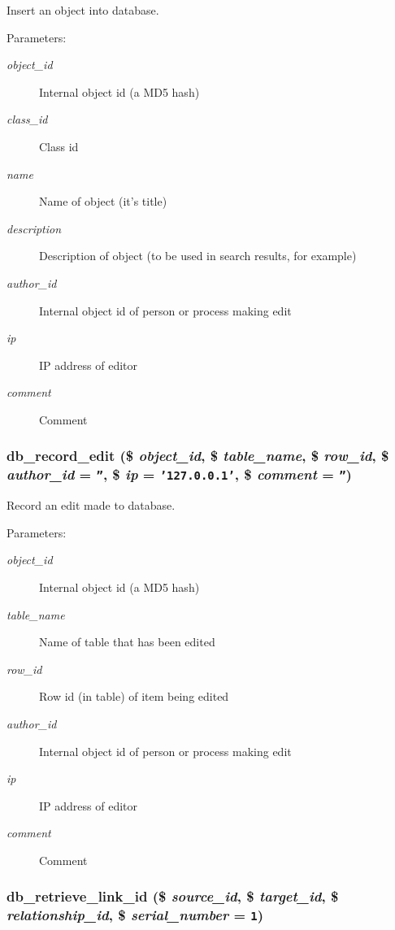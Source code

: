Insert an object into database. 

\begin{Desc}
\item[Parameters:]
\begin{description}
\item[{\em object\_\-id}]Internal object id (a MD5 hash) \item[{\em class\_\-id}]Class id \item[{\em name}]Name of object (it's title) \item[{\em description}]Description of object (to be used in search results, for example) \item[{\em author\_\-id}]Internal object id of person or process making edit \item[{\em ip}]IP address of editor \item[{\em comment}]Comment \end{description}
\end{Desc}
\hypertarget{eav_8php_1749f5ed26505143b2f675c5f907c4e7}{
\subsubsection{\setlength{\rightskip}{0pt plus 5cm}db\_\-record\_\-edit (\$ {\em object\_\-id}, \/  \$ {\em table\_\-name}, \/  \$ {\em row\_\-id}, \/  \$ {\em author\_\-id} = {\tt ''}, \/  \$ {\em ip} = {\tt '127.0.0.1'}, \/  \$ {\em comment} = {\tt ''})}}
\label{eav_8php_1749f5ed26505143b2f675c5f907c4e7}


Record an edit made to database. 

\begin{Desc}
\item[Parameters:]
\begin{description}
\item[{\em object\_\-id}]Internal object id (a MD5 hash) \item[{\em table\_\-name}]Name of table that has been edited \item[{\em row\_\-id}]Row id (in table) of item being edited \item[{\em author\_\-id}]Internal object id of person or process making edit \item[{\em ip}]IP address of editor \item[{\em comment}]Comment \end{description}
\end{Desc}
\hypertarget{eav_8php_af41b9a208dee0874f2fb40ae2678586}{
\subsubsection{\setlength{\rightskip}{0pt plus 5cm}db\_\-retrieve\_\-link\_\-id (\$ {\em source\_\-id}, \/  \$ {\em target\_\-id}, \/  \$ {\em relationship\_\-id}, \/  \$ {\em serial\_\-number} = {\tt 1})}}
\label{eav_8php_af41b9a208dee0874f2fb40ae2678586}


